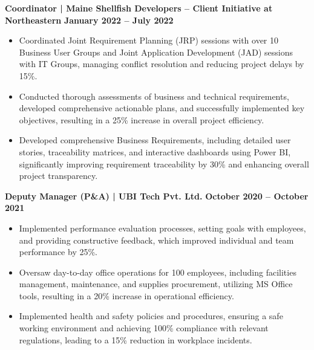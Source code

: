 \documentclass{article}
\begin{document}
\noindent \textbf{Coordinator | Maine Shellfish Developers – Client Initiative at Northeastern} \hfill \textbf{January 2022 – July 2022}
\begin{itemize}[noitemsep,nolistsep,leftmargin=*]
\item {\small Coordinated Joint Requirement Planning (JRP) sessions with over 10 Business User Groups and Joint Application Development (JAD) sessions with IT Groups, managing conflict resolution and reducing project delays by 15\%.}
\item {\small Conducted thorough assessments of business and technical requirements, developed comprehensive actionable plans, and successfully implemented key objectives, resulting in a 25\% increase in overall project efficiency.}
\item {\small Developed comprehensive Business Requirements, including detailed user stories, traceability matrices, and interactive dashboards using Power BI, significantly improving requirement traceability by 30\% and enhancing overall project transparency.}
\end{itemize}
\vspace{1mm}

\noindent \textbf{Deputy Manager (P\&A) | UBI Tech Pvt. Ltd.} \hfill \textbf{October 2020 – October 2021}
\begin{itemize}[noitemsep,nolistsep,leftmargin=*]
\item {\small Implemented performance evaluation processes, setting goals with employees, and providing constructive feedback, which improved individual and team performance by 25\%.}
\item {\small Oversaw day-to-day office operations for 100 employees, including facilities management, maintenance, and supplies procurement, utilizing MS Office tools, resulting in a 20\% increase in operational efficiency.}
\item {\small Implemented health and safety policies and procedures, ensuring a safe working environment and achieving 100\% compliance with relevant regulations, leading to a 15\% reduction in workplace incidents.}
\end{itemize}
\vspace{1mm}
\end{document}
